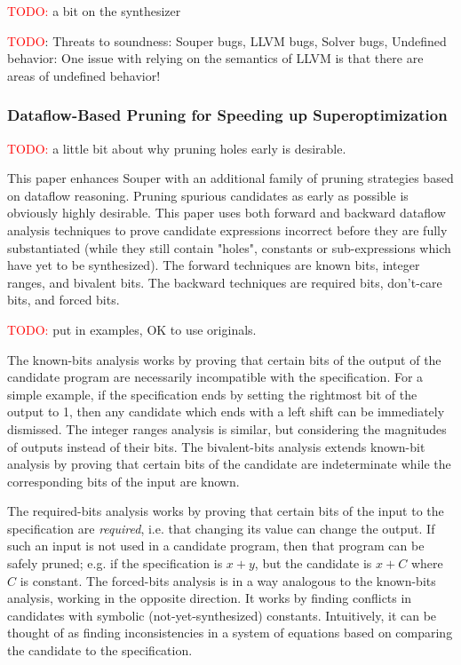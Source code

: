\documentclass[12pt,twoside]{reedthesis}
\newcommand{\red}[1]{\textcolor{red}{#1}}
\begin{document}
\red{TODO:} a bit on the synthesizer

\red{TODO}: Threats to soundness:
    Souper bugs,
    LLVM bugs,
    Solver bugs,
    Undefined behavior: One issue with relying on the semantics of LLVM is that there are areas of undefined behavior!

\subsubsection{Dataflow-Based Pruning for Speeding up Superoptimization}
\red{TODO:} a little bit about why pruning holes early is desirable.

This paper \cite{mukherjee2020dataflow} enhances Souper with an additional family of pruning strategies based on dataflow reasoning. 
Pruning spurious candidates as early as possible is obviously highly desirable.
This paper uses both forward and backward dataflow analysis techniques to prove candidate expressions incorrect before they are fully substantiated (while they still contain "holes", constants or sub-expressions which have yet to be synthesized).
The forward techniques are known bits,
                           integer ranges, and
                           bivalent bits.
The backward techniques are required bits,
                            don't-care bits, and
                            forced bits.

\red{TODO:} put in examples, OK to use originals.

The known-bits analysis works by proving that certain bits of the output of the candidate program are necessarily incompatible with the specification.
For a simple example, if the specification ends by setting the rightmost bit of the output to 1, then any candidate which ends with a left shift can be immediately dismissed.
The integer ranges analysis is similar, but considering the magnitudes of outputs instead of their bits.
The bivalent-bits analysis extends known-bit analysis by proving that certain bits of the candidate are indeterminate while the corresponding bits of the input are known.

The required-bits analysis works by proving that certain bits of the input to the specification are \emph{required}, i.e. that changing its value can change the output. If such an input is not used in a candidate program, then that program can be safely pruned; e.g. if the specification is $x + y$, but the candidate is $x + C$ where $C$ is constant.
The forced-bits analysis is in a way analogous to the known-bits analysis, working in the opposite direction. It works by finding conflicts in candidates with symbolic (not-yet-synthesized) constants. Intuitively, it can be thought of as finding inconsistencies in a system of equations based on comparing the candidate to the specification. %
\end{document}
